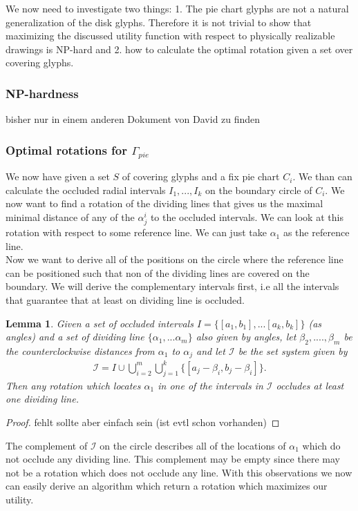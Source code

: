 \documentclass[a4paper,11pt]{article}
\newtheorem{lemma}{Lemma}
\begin{document}
We now need to investigate two things: 1. The pie chart glyphs are not a natural generalization of the disk glyphs. Therefore it is not trivial to show that maximizing the discussed utility function with respect to physically realizable drawings is NP-hard and 2. how to calculate the optimal rotation given a set over covering glyphs.
\subsubsection*{NP-hardness}
\color{blue}
bisher nur in einem anderen Dokument von David zu finden
\color{black}
\subsubsection*{Optimal rotations for $\Gamma_{pie}$}
We now have given a set $S$ of covering glyphs and a fix pie chart $C_i$. We than can calculate the occluded radial intervals $I_1,...,I_k$ on the boundary circle of $C_i$. We now want to find a rotation of the dividing lines that gives us the maximal minimal distance of any of the $\alpha^i_j$ to the occluded intervals. We can look at this rotation with respect to some reference line. We can just take $\alpha_1$ as the reference line.\\
Now we want to derive all of the positions on the circle where the reference line can be positioned such that non of the dividing lines are covered on the boundary. We will derive the complementary intervals first, i.e all the intervals that guarantee that at least on dividing line is occluded.
\begin{lemma}
Given a set of occluded intervals $I=\{[a_1,b_1],...[a_k,b_k]\}$ (as angles) and a set of dividing line $\{\alpha_1,...\alpha_m\}$ also given by angles, let $\beta_2,....,\beta_m$ be the counterclockwise distances from $\alpha_1$ to $\alpha_j$ and let $\mathcal{I}$ be the set system given by
\begin{align*}
\mathcal{I}=I \cup \bigcup_{i=2}^m    \bigcup_{j=1}^k \{ [a_j-\beta_i,b_j-\beta_i]   \}.
\end{align*}
Then any rotation which locates $\alpha_1$ in one of the intervals in $\mathcal{I}$ occludes at least one dividing line.
\end{lemma}
\begin{proof}
\color{blue}
fehlt sollte aber einfach sein (ist evtl schon vorhanden)
\color{black}
\end{proof}
The complement of $\mathcal{I}$ on the circle describes all of the locations of $\alpha_1$ which do not occlude any dividing line. This complement may be empty since there may not be a rotation which does not occlude any line. With this observations we now can easily derive an algorithm which return a rotation which maximizes our utility.
\end{document}
